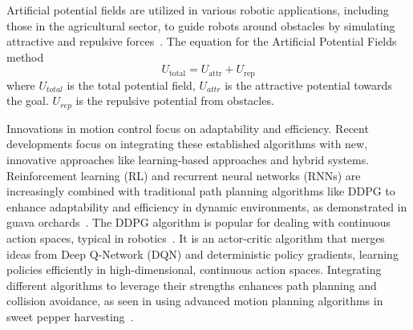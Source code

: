 \documentclass{ieeeaccess}
\begin{document}
Artificial potential fields are utilized in various robotic applications, including those in the agricultural sector, to guide robots around obstacles by simulating attractive and repulsive forces~\cite{ling2019dual}. The equation for the Artificial Potential Fields method
\begin{equation}
U_{\text{total}} = U_{\text{attr}} + U_{\text{rep}}
\label{eq:potentialfields}
\end{equation}
where $U_{total}$ is the total potential field, $U_{attr}$ is the attractive potential towards the goal. $U_{rep}$ is the repulsive potential from obstacles.

Innovations in motion control focus on adaptability and efficiency. Recent developments focus on integrating these established algorithms with new, innovative approaches like learning-based approaches and hybrid systems. Reinforcement learning (RL) and recurrent neural networks (RNNs) are increasingly combined with traditional path planning algorithms like  DDPG to enhance adaptability and efficiency in dynamic environments, as demonstrated in guava orchards~\cite{lin2021collision}.
The DDPG algorithm is popular for dealing with continuous action spaces, typical in robotics~\cite{lillicrap2015continuous}. It is an actor-critic algorithm that merges ideas from Deep Q-Network (DQN) and deterministic policy gradients, learning policies efficiently in high-dimensional, continuous action spaces.
Integrating different algorithms to leverage their strengths enhances path planning and collision avoidance, as seen in using advanced motion planning algorithms in sweet pepper harvesting~\cite{lehnert2017autonomous}.
\end{document}
